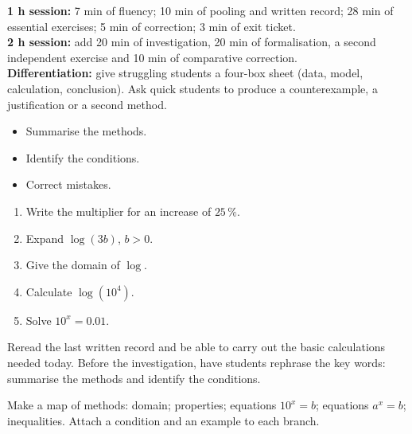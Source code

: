\ifprof
\begin{methode}
\textbf{1 h session:} 7 min of fluency; 10 min of pooling and written record; 28 min of essential exercises; 5 min of correction; 3 min of exit ticket.\\
\textbf{2 h session:} add 20 min of investigation, 20 min of formalisation, a second independent exercise and 10 min of comparative correction.\\
\textbf{Differentiation:} give struggling students a four-box sheet (data, model, calculation, conclusion). Ask quick students to produce a counterexample, a justification or a second method.
\end{methode}
\fi
{}
\begin{objectifs}\begin{itemize}\item Summarise the methods.\item Identify the conditions.\item Correct mistakes.\end{itemize}\end{objectifs}
\begin{automatismes}\begin{enumerate}\item Write the multiplier for an increase of $25\,\%$. \item Expand $\log(3b)$, $b>0$. \item Give the domain of $\log$. \rep{$]0,+\infty[$}\item Calculate $\log(10^4)$. \item Solve $10^x=0.01$. \end{enumerate}\end{automatismes}
\begin{prerequis}Reread the last written record and be able to carry out the basic calculations needed today. Before the investigation, have students rephrase the key words: summarise the methods and identify the conditions.\end{prerequis}

\begin{activite}
Make a map of methods: domain; properties; equations $10^x=b$; equations $a^x=b$; inequalities. Attach a condition and an example to each branch.

\end{activite}

